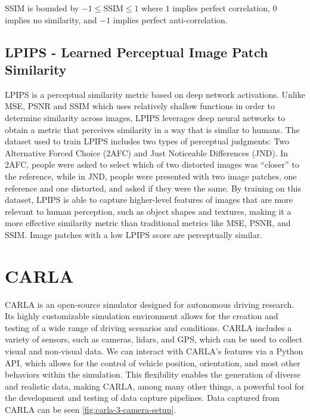 SSIM is bounded by $-1 \leq \text{SSIM} \leq 1$ where $1$ implies perfect correlation, $0$ implies no similarity, and $-1$ implies perfect anti-correlation.


\subsection{LPIPS - Learned Perceptual Image Patch Similarity}
LPIPS \cite{zhang_unreasonable_2018} is a perceptual similarity metric based on deep network activations. Unlike MSE, PSNR and SSIM which uses relatively shallow functions in order to determine similarity across images, LPIPS leverages deep neural networks to obtain a metric that perceives similarity in a way that is similar to humans. The dataset used to train LPIPS includes two types of perceptual judgments: Two Alternative Forced Choice (2AFC) and Just Noticeable Differences (JND). In 2AFC, people were asked to select which of two distorted images was “closer” to the reference, while in JND, people were presented with two image patches, one reference and one distorted, and asked if they were the same. By training on this dataset, LPIPS is able to capture higher-level features of images that are more relevant to human perception, such as object shapes and textures, making it a more effective similarity metric than traditional metrics like MSE, PSNR, and SSIM. Image patches with a low LPIPS score are perceptually similar.





\section{CARLA} \label{sec:carla}

CARLA \cite{Dosovitskiy17} is an open-source simulator designed for autonomous driving research. Its highly customizable simulation environment allows for the creation and testing of a wide range of driving scenarios and conditions. CARLA includes a variety of sensors, such as cameras, lidars, and GPS, which can be used to collect visual and non-visual data. We can interact with CARLA’s features via a Python API, which allows for the control of vehicle position, orientation, and most other behaviors within the simulation. This flexibility enables the generation of diverse and realistic data, making CARLA, among many other things, a powerful tool for the development and testing of data capture pipelines. Data captured from CARLA can be seen \autoref{fig:carla-3-camera-setup}.

